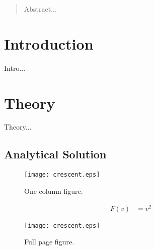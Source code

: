 \documentclass[aps,twocolumn,pre,nofootinbib]{revtex4}
\begin{document}
\begin{abstract}

Abstract... 
  
\end{abstract}


\maketitle



\section{Introduction \label{sec:int}}

Intro...


 

\section{Theory \label{sec:the}}

Theory...


\subsection{Analytical Solution}


\begin{figure}
\texttt{[image: crescent.eps]} 
\caption{One column figure.
}
\label{fig:Half}
\end{figure}
 
\begin{equation}
\begin{split}
F(v) &= v^2 
\end{split}
\label{Simple example}
\end{equation}



\begin{figure*}

\texttt{[image: crescent.eps]} 
\caption{Full page figure.
}
\label{fig:Full}
\end{figure*}
\end{document}
